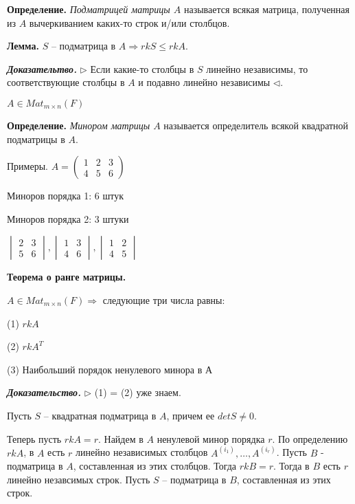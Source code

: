 \bigskip
\textbf{Определение.} \textit{Подматрицей матрицы $A$} называется всякая матрица, полученная из $A$ вычеркиванием каких-то строк и/или столбцов.

\bigskip
\textbf{Лемма.} $S$ -- подматрица в $A \Rightarrow rkS \leq rkA$.

\bigskip
\textbf{\textit{Доказательтво.}} $\rhd$ Если какие-то столбцы в $S$ линейно независимы, то соответствующие столбцы в $A$ и подавно линейно независимы $\lhd$.

\bigskip
$A \in Mat_{m \times n} (F)$

\textbf{Определение.} \textit{Минором матрицы $A$} называется определитель всякой квадратной подматрицы в $A$.

\bigskip
Примеры. $A = \begin{pmatrix} 1 & 2 & 3 \\ 4 & 5 & 6 \end{pmatrix}$

Миноров порядка 1: 6 штук

Миноров порядка 2: 3 штуки

$\begin{vmatrix} 2 & 3 \\ 5 & 6 \end{vmatrix}, \begin{vmatrix} 1 & 3 \\ 4 & 6 \end{vmatrix}, \begin{vmatrix} 1 & 2 \\ 4 & 5 \end{vmatrix}$

\bigskip
\textbf{Теорема о ранге матрицы.} 

$A \in Mat_{m \times n} (F) \Rightarrow$ следующие три числа равны:

(1) $rkA$

(2) $rkA^T$

(3) Наибольший порядок ненулевого минора в $А$

\bigskip
\textbf{\textit{Доказательство.}} $\rhd$ (1) = (2) уже знаем.

Пусть $S$ -- квадратная подматрица в $A$, причем ее $detS \neq 0$.

\bigskip
Теперь пусть $rkA = r$. Найдем в $A$ ненулевой минор порядка $r$. По определению $rkA$, в $A$ есть $r$ линейно независимых столбцов $A^{(i_1)}, \dots, A^{(i_r)}$. Пусть $B$ - подматрица в $A$, составленная из этих столбцов. Тогда $rkB = r$. Тогда в $B$ есть $r$ линейно незавсимых строк. Пусть $S$ -- подматрица в $B$, составленная из этих строк.

